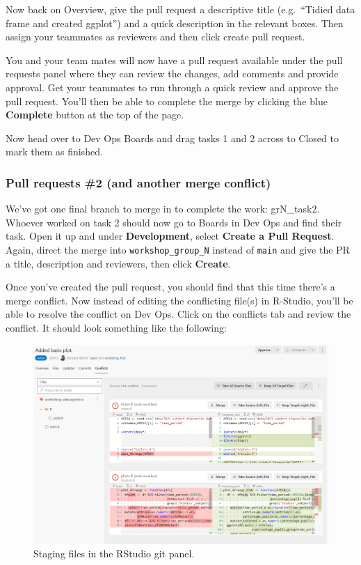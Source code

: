 \documentclass[
  12pt,
]{article}
\begin{document}
Now back on Overview, give the pull request a descriptive title
(e.g.~``Tidied data frame and created ggplot'') and a quick description
in the relevant boxes. Then assign your teammates as reviewers and then
click create pull request.

You and your team mates will now have a pull request available under the
pull requests panel where they can review the changes, add comments and
provide approval. Get your teammates to run through a quick review and
approve the pull request. You'll then be able to complete the merge by
clicking the blue \textbf{Complete} button at the top of the page.

Now head over to Dev Ops Boards and drag tasks 1 and 2 across to Closed
to mark them as finished.

\hypertarget{pull-requests-2-and-another-merge-conflict}{%
\subsubsection{Pull requests \#2 (and another merge
conflict)}\label{pull-requests-2-and-another-merge-conflict}}

We've got one final branch to merge in to complete the work: grN\_task2.
Whoever worked on task 2 should now go to Boards in Dev Ops and find
their task. Open it up and under \textbf{Development}, select
\textbf{Create a Pull Request}. Again, direct the merge into
\texttt{workshop\_group\_N} instead of \texttt{main} and give the PR a
title, description and reviewers, then click \textbf{Create}.

Once you've created the pull request, you should find that this time
there's a merge conflict. Now instead of editing the conflicting file(s)
in R-Studio, you'll be able to resolve the conflict on Dev Ops. Click on
the conflicts tab and review the conflict. It should look something like
the following:

\begin{figure}

{\centering \includegraphics[width=0.96\linewidth]{images/DevOpsdemo/DevOps_PR_mergeconflict_1} 

}

\caption{Staging files in the RStudio git panel.}\label{fig:unnamed-chunk-17}
\end{figure}
\end{document}
